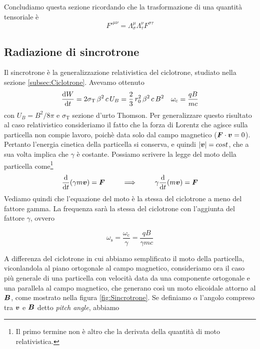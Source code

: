 Concludiamo questa sezione ricordando che la trasformazione di una quantità tensoriale è 
\begin{equation}
F'^{\mu\nu}= \Lambda_\sigma^\mu \Lambda_\tau^\nu F^{\sigma\tau}
\end{equation}

\subsection{Radiazione di sincrotrone}\label{subsec:Sincrotrone}
Il sincrotrone è la generalizzazione relativistica del ciclotrone, studiato nella sezione
\ref{subsec:Ciclotrone}. Avevamo ottenuto 
\begin{align}
&\dfrac{\mathrm{d} {W}}{\mathrm{d} {t}} = 2\sigma_\mathrm{T} \,\beta^2\, c\, U_B = \dfrac{2}{3} \,r_0^2\,\beta^2 \,c \,B^2
&\omega_\mathrm{c} = \dfrac{qB}{mc}
\end{align}
con $U_B=B^2/8\pi$ e $\sigma_\mathrm{T}$ sezione d'urto Thomson. Per generalizzare questo risultato al caso relativistico consideriamo il fatto che la forza di Lorentz che agisce sulla particella non compie lavoro, poichè data solo dal campo magnetico ($\scal{F}{v}=0$). Pertanto l'energia cinetica della particella si conserva, e quindi $|\V{v}|=cost$, che a sua volta implica che $\gamma$ è costante. Possiamo scrivere la legge del moto della particella come\footnote{Il primo termine non è altro che la derivata della quantità di moto relativistica.}
\begin{equation}
\der{}{t}(\gamma m \V{v}) = \V{F} \,\,\,\,\,\,\,\,\,\,\,\,\,\,\, \Longrightarrow \,\,\,\,\,\,\,\,\,\,\,\,\,\,\, \gamma\der{}{t}(m \V{v}) = \V{F}
\end{equation}
Vediamo quindi che l'equazione del moto è la stessa del ciclotrone a meno del fattore gamma. La frequenza sarà la stessa del ciclotrone con l'aggiunta del fattore $\gamma$, ovvero
\begin{EQ}
\begin{equation}
\omega_\mathrm{s} = \dfrac{\omega_\mathrm{c}}{\gamma} = \dfrac{qB}{\gamma mc}
\end{equation}
\end{EQ}
A differenza del ciclotrone in cui abbiamo semplificato il moto della particella, viconlandola al piano ortogonale al campo magnetico, consideriamo ora il caso più generale di una particella con velocità data da una componente ortogonale e una parallela al campo magnetico, che generano così un moto elicoidale attorno al $\V{B}$, come mostrato nella figura \ref{fig:Sincrotrone}. Se definiamo $\alpha$ l'angolo compreso tra $\V{v}$ e $\V{B}$ detto \textit{pitch angle}, abbiamo

